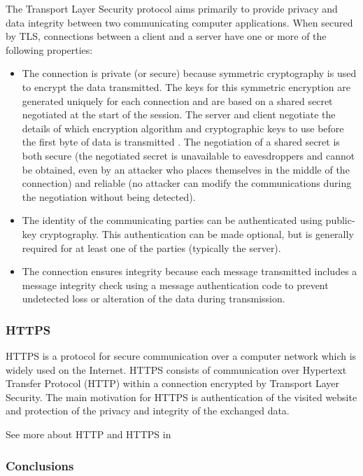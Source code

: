 The Transport Layer Security protocol aims primarily to provide privacy and data integrity between two communicating computer applications. When secured by TLS, connections between a client  and a server have one or more of the following properties:
\begin{itemize}
\item The connection is private (or secure) because symmetric cryptography is used to encrypt the data transmitted. The keys for this symmetric encryption are generated uniquely for each connection and are based on a shared secret negotiated at the start of the session. The server and client negotiate the details of which encryption algorithm and cryptographic keys to use before the first byte of data is transmitted . The negotiation of a shared secret is both secure (the negotiated secret is unavailable to eavesdroppers and cannot be obtained, even by an attacker who places themselves in the middle of the connection) and reliable (no attacker can modify the communications during the negotiation without being detected).
\item The identity of the communicating parties can be authenticated using public-key cryptography. This authentication can be made optional, but is generally required for at least one of the parties (typically the server).
\item The connection ensures integrity because each message transmitted includes a message integrity check using a message authentication code to prevent undetected loss or alteration of the data during transmission.
\end{itemize}

\subsubsection{HTTPS}
HTTPS is a protocol for secure communication over a computer network which is widely used on the Internet. HTTPS consists of communication over Hypertext Transfer Protocol (HTTP) within a connection encrypted by Transport Layer Security. The main motivation for HTTPS is authentication of the visited website and protection of the privacy and integrity of the exchanged data.

See more about HTTP and HTTPS in \cite{HTTPS}


\subsubsection{Conclusions}

